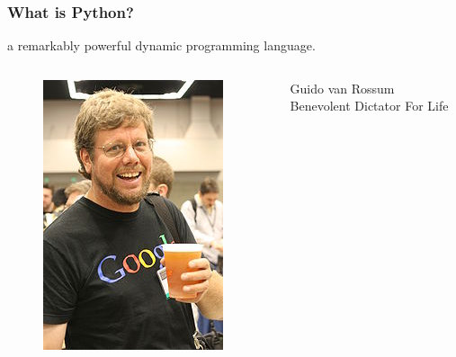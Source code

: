 \documentclass[compress=true]{beamer}
\begin{document}
\begin{frame}
	\frametitle{What is Python?}
	\begin{center}
 a remarkably powerful dynamic programming language.
	 \end{center}
		\begin{columns}
		\begin{column}{0.4\textheight}
			\begin{figure}[h]
				\centering
				\includegraphics[height=0.5\textheight]{GvR.jpg}
			\end{figure}
		\end{column}
		\begin{column}{0.6\textheight}
			Guido van Rossum\\
			Benevolent Dictator For Life
		\end{column}
	\end{columns}		
\end{frame}
\end{document}
